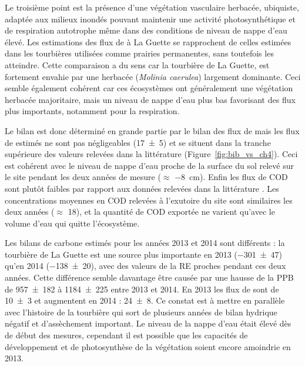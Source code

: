 Le troisième point est la présence d'une végétation vasculaire herbacée, ubiquiste, adaptée aux milieux inondés pouvant maintenir une activité photosynthétique et de respiration autotrophe même dans des conditions de niveau de nappe d'eau élevé.
Les estimations des flux de \coo à La Guette se rapprochent de celles estimées dans les tourbières utilisées comme prairies permanentes, sans toutefois les atteindre.
Cette comparaison a du sens car la tourbière de La Guette, est fortement envahie par une herbacée (\textit{Molinia caerulea}) largement dominante.
Ceci semble également cohérent car ces écosystèmes ont généralement une végétation herbacée majoritaire, mais un niveau de nappe d'eau plus bas favorisant des flux plus importants, notamment pour la respiration.

Le bilan est donc déterminé en grande partie par le bilan des flux de \coo mais les flux de \chh estimés ne sont pas négligeables (\SI{17(5)}{\gcma}) et se situent dans la tranche supérieure des valeurs relevées dans la littérature (Figure~\ref{fig:bib_vs_ch4}). Ceci est cohérent avec le niveau de nappe d'eau proche de la surface du sol relevé sur le site pendant les deux années de mesure ($\approx$ \SI{-8}{\centi\metre}).
Enfin les flux de COD sont plutôt faibles par rapport aux données relevées dans la littérature \citep{koehler2011,vanselow-algan2015}.
Les concentrations moyennes en COD relevées à l'exutoire du site sont similaires les deux années ($\approx$ \SI{18}{\mgl}), et la quantité de COD exportée ne varient qu'avec le volume d'eau qui quitte l'écosystème.

Les bilans de carbone estimés pour les années 2013 et 2014 sont différents : la tourbière de La Guette est une source plus importante en 2013 (\SI{-301(47)}{\gcma}) qu'en 2014 (\SI{-138(20)}{\gcma}), avec des valeurs de la RE proches pendant ces deux années.
Cette différence semble davantage être causée par une hausse de la PPB de \num{957(182)} à \SI{1184(225)}{\gcma} entre 2013 et 2014.
En 2013 les flux de \chh sont de \SI{10(3)}{\gcma} et augmentent en 2014 : \SI{24(8)}{\gcma}.
Ce constat est à mettre en parallèle avec l'histoire de la tourbière qui sort de plusieurs années de bilan hydrique négatif et d'assèchement important.
Le niveau de la nappe d'eau était élevé dès de début des mesures, cependant il est possible que les capacités de développement et de photosynthèse de la végétation soient encore amoindrie en 2013.




